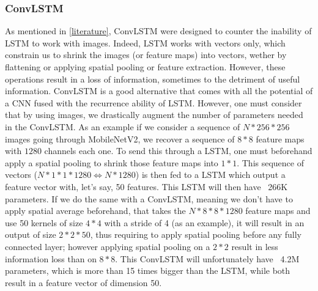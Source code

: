 \documentclass[12pt, a4paper]{report}
\begin{document}
				\subsubsection{ConvLSTM}
					As mentioned in \ref{literature}, ConvLSTM were designed to counter the inability of LSTM to work with images.
					Indeed, LSTM works with vectors only, which constrain us to shrink the images (or feature maps) into vectors, wether by flattening or applying spatial pooling or feature extraction.
					However, these operations result in a loss of information, sometimes to the detriment of useful information.
					ConvLSTM is a good alternative that comes with all the potential of a CNN fused with the recurrence ability of LSTM.
					However, one must consider that by using images, we drastically augment the number of parameters needed in the ConvLSTM.
					As an example if we consider a sequence of $N*256*256$ images going through MobileNetV2, we recover a sequence of $8*8$ feature maps with $1280$ channels each one.
					To send this through a LSTM, one must beforehand apply a spatial pooling to shrink those feature maps into $1*1$.
					This sequence of vectors ($N*1*1*1280 \Leftrightarrow N*1280$) is then fed to a LSTM which output a feature vector with, let's say, 50 features.
					This LSTM will then have ~266K parameters.
					If we do the same with a ConvLSTM, meaning we don't have to apply spatial average beforehand, that takes the $N*8*8*1280$ feature maps and use 50 kernels of size $4*4$ with a stride of 4 (as an example), it will result in an output of size $2*2*50$, thus requiring to apply spatial pooling before any fully connected layer; however applying spatial pooling on a $2*2$ result in less information loss than on $8*8$.
					This ConvLSTM will unfortunately have ~4.2M parameters, which is more than 15 times bigger than the LSTM, while both result in a feature vector of dimension 50.
\end{document}
